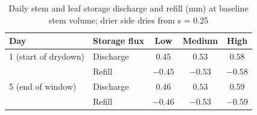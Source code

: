 \begin{table}[H]
\centering
\caption{Daily stem and leaf storage discharge and refill (mm) at baseline stem volume; drier side dries from s = 0.25}
\label{tab:vwt_s2_one_daily_storage}
\begin{tabular}{llccc}
\hline
Day & Storage flux & Low & Medium & High \\
\hline
1 (start of drydown) & Discharge & $0.45$ & $0.53$ & $0.58$ \\
 & Refill & $-0.45$ & $-0.53$ & $-0.58$ \\
\hline
5 (end of window) & Discharge & $0.46$ & $0.53$ & $0.59$ \\
 & Refill & $-0.46$ & $-0.53$ & $-0.59$ \\
\hline
\end{tabular}
\end{table}
